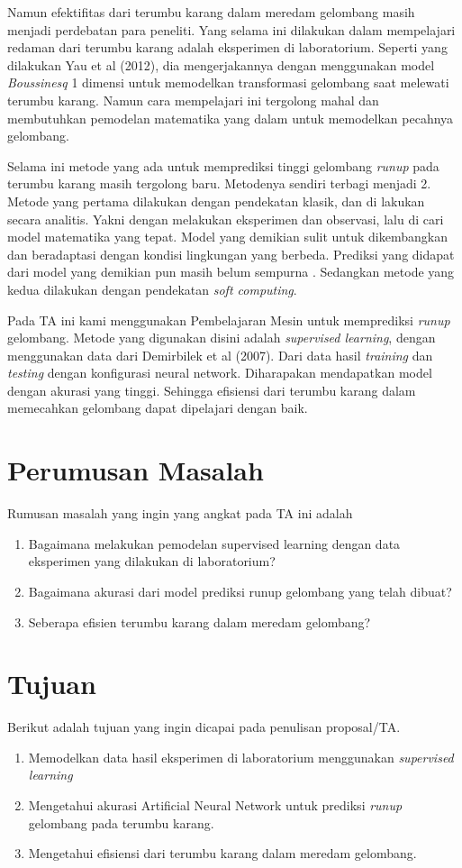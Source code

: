 Namun efektifitas dari terumbu karang dalam meredam gelombang masih menjadi perdebatan para peneliti. Yang selama ini dilakukan dalam mempelajari redaman dari terumbu karang adalah eksperimen di laboratorium. Seperti yang dilakukan Yau et al (2012)\cite{YAO201230}, dia mengerjakannya dengan menggunakan model \emph{Boussinesq} 1 dimensi untuk memodelkan transformasi gelombang saat melewati terumbu karang.  Namun cara mempelajari ini tergolong mahal dan membutuhkan pemodelan matematika yang dalam untuk memodelkan pecahnya gelombang.

Selama ini metode yang ada untuk memprediksi tinggi gelombang \emph{runup} pada terumbu karang masih tergolong baru. Metodenya sendiri terbagi menjadi 2. Metode yang pertama dilakukan dengan pendekatan klasik, dan di lakukan secara analitis. Yakni dengan melakukan eksperimen dan observasi, lalu di cari model matematika yang tepat. Model yang demikian sulit untuk dikembangkan dan beradaptasi dengan kondisi lingkungan yang berbeda. Prediksi yang didapat dari model yang demikian pun masih belum sempurna \cite{DemirbilekBoussinesq}. Sedangkan metode yang kedua dilakukan dengan pendekatan \emph{soft computing}.

Pada TA ini kami menggunakan Pembelajaran Mesin untuk memprediksi \emph{runup} gelombang. Metode yang digunakan disini adalah \emph{supervised learning}, dengan menggunakan data dari Demirbilek et al (2007)\cite{DemirbilekReport}. Dari data hasil \emph{training} dan \emph{testing} dengan konfigurasi neural network. Diharapakan mendapatkan model dengan akurasi yang tinggi. Sehingga efisiensi dari terumbu karang dalam memecahkan gelombang dapat dipelajari dengan baik.

\section{Perumusan Masalah}
Rumusan masalah yang ingin yang angkat pada TA ini adalah
\begin{enumerate}
    \item Bagaimana melakukan pemodelan supervised learning dengan data eksperimen yang dilakukan di laboratorium?
    \item Bagaimana akurasi dari model prediksi runup gelombang yang telah dibuat?
    \item Seberapa efisien terumbu karang dalam meredam gelombang?
\end{enumerate}
\section{Tujuan}
Berikut adalah tujuan yang ingin dicapai pada penulisan proposal/TA.
\begin{enumerate}
    \item Memodelkan data hasil eksperimen di laboratorium menggunakan \emph{supervised learning}
    \item Mengetahui akurasi Artificial Neural Network untuk prediksi \emph{runup} gelombang pada terumbu karang.
    \item Mengetahui efisiensi dari terumbu karang dalam meredam gelombang.
\end{enumerate}
